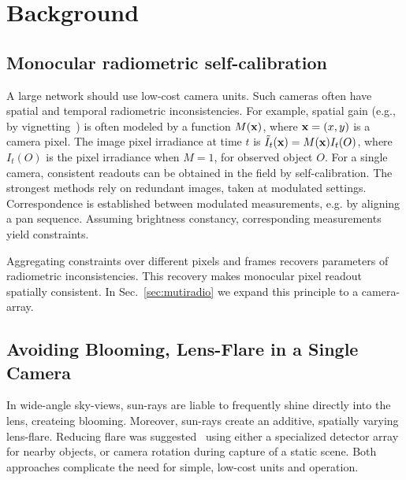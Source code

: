 \documentclass[runningheads]{llncs}
\begin{document}
\section{Background}
\label{sec:theory}


\subsection{Monocular radiometric self-calibration}
\label{sec:Signelradio}

A large network should use low-cost camera units. Such cameras often have spatial and temporal radiometric inconsistencies. For example, spatial gain (e.g., by vignetting~\cite{LitvinovCVPR05,Kang2000}) is often modeled by a function $M({\bf x})$, where \mbox{${\bf x}=(x,y)$} is a camera pixel. The image pixel irradiance at time $t$ is
\mbox{$ \tilde{I}_t({\bf x}) = M({\bf x})I_t(O)$}, where $I_t(O)$ is the pixel irradiance when $M=1$, for observed object $O$. For a single camera, consistent readouts can be obtained in the field by self-calibration. The strongest methods rely on redundant images, taken at modulated settings.
Correspondence is established between modulated measurements, e.g. by aligning a pan sequence. Assuming brightness constancy, corresponding measurements yield constraints.

Aggregating constraints over different pixels and frames recovers parameters of radiometric inconsistencies. This recovery makes monocular pixel readout spatially consistent. In Sec.~\ref{sec:mutiradio} we expand this principle to a camera-array.



\subsection{Avoiding Blooming, Lens-Flare in a Single Camera}
\label{sec:Signelflare}

In wide-angle sky-views, sun-rays are liable to frequently shine directly into the lens, createing blooming. Moreover, sun-rays create an additive, spatially varying lens-flare. Reducing flare was suggested~\cite{Koreban2009,Raskar2008,Talvala2007,Rouf2011} using either a specialized detector array for nearby objects, or camera rotation during capture of a static scene. Both approaches complicate the need for simple, low-cost units and operation.
\end{document}
